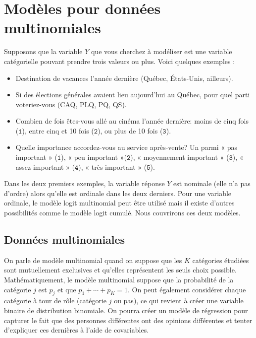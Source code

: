 \documentclass[
  11pt,
  letterpaper,
]{scrbook}
\providecommand{\tightlist}{%
  \setlength{\itemsep}{0pt}\setlength{\parskip}{0pt}}\usepackage{longtable,booktabs,array}
\theoremstyle{definition}
\theoremstyle{remark}
\begin{document}
\hypertarget{moduxe8les-pour-donnuxe9es-multinomiales}{%
\section{Modèles pour données
multinomiales}\label{moduxe8les-pour-donnuxe9es-multinomiales}}

Supposons que la variable \(Y\) que vous cherchez à modéliser est une
variable catégorielle pouvant prendre trois valeurs ou plus. Voici
quelques exemples :

\begin{itemize}
\tightlist
\item
  Destination de vacances l'année dernière (Québec, États-Unis,
  ailleurs).
\item
  Si des élections générales avaient lieu aujourd'hui au Québec, pour
  quel parti voteriez-vous (CAQ, PLQ, PQ, QS).
\item
  Combien de fois êtes-vous allé au cinéma l'année dernière: moins de
  cinq fois (\(\texttt{1}\)), entre cinq et 10 fois (\(\texttt{2}\)), ou
  plus de 10 fois (\(\texttt{3}\)).
\item
  Quelle importance accordez-vous au service après-vente? Un parmi « pas
  important » (\(\texttt{1}\)), « peu important »(\(\texttt{2}\)), «
  moyennement important » (\(\texttt{3}\)), « assez important »
  (\(\texttt{4}\)), « très important » (\(\texttt{5}\)).
\end{itemize}

Dans les deux premiers exemples, la variable réponse \(Y\) est nominale
(elle n'a pas d'ordre) alors qu'elle est ordinale dans les deux
derniers. Pour une variable ordinale, le modèle logit multinomial peut
être utilisé mais il existe d'autres possibilités comme le modèle logit
cumulé. Nous couvrirons ces deux modèles.

\hypertarget{donnuxe9es-multinomiales}{%
\subsection{Données multinomiales}\label{donnuxe9es-multinomiales}}

On parle de modèle multinomial quand on suppose que les \(K\) catégories
étudiées sont mutuellement exclusives et qu'elles représentent les seuls
choix possible. Mathématiquement, le modèle multinomial suppose que la
probabilité de la catégorie \(j\) est \(p_j\) et que
\(p_1 + \cdots + p_K=1\). On peut également considérer chaque catégorie
à tour de rôle (catégorie \(j\) ou pas), ce qui revient à créer une
variable binaire de distribution binomiale. On pourra créer un modèle de
régression pour capturer le fait que des personnes différentes ont des
opinions différentes et tenter d'expliquer ces dernières à l'aide de
covariables.
\end{document}
